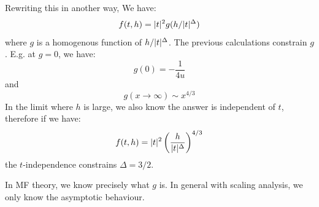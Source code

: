 Rewriting this in another way, We have:
\begin{equation}
    f(t, h) = \lvert t \rvert^2g(h/\lvert t \rvert^\Delta)
\end{equation}
where $g$ is a homogenous function of $h/\lvert t \rvert^\Delta$. The previous calculations constrain $g$. E.g. at $g = 0$, we have:
\begin{equation}
    g(0) = -\frac{1}{4u}
\end{equation}
and
\begin{equation}
    g(x\to\infty) \sim x^{4/3}
\end{equation}
In the limit where $h$ is large, we also know the answer is independent of $t$, therefore if we have:
\begin{equation}
    f(t, h) = \lvert t \rvert^2\left(\frac{h}{\lvert t \rvert^\Delta}\right)^{4/3}
\end{equation}
the $t$-independence constrains $\Delta = 3/2$. 

In MF theory, we know precisely what $g$ is. In general with scaling analysis, we only know the asymptotic behaviour.

